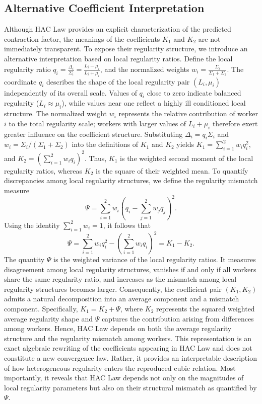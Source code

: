\documentclass[mathematics,article,submit,moreauthors]{Definitions/mdpi}
\begin{document}
\subsection{Alternative Coefficient Interpretation} \label{sec:weighted-moment} Although HAC Law provides an explicit characterization of the predicted contraction factor, the meanings of the coefficients \(K_1\) and \(K_2\) are not immediately transparent. To expose their regularity structure, we introduce an alternative interpretation based on local regularity ratios. Define the local regularity ratio $q_i = \frac{\Delta_i}{\Sigma_i} = \frac{L_i-\mu_i}{L_i+\mu_i}$, and the normalized weights $w_i = \frac{\Sigma_i}{\Sigma_1+\Sigma_2}$. The coordinate \(q_i\) describes the shape of the local regularity pair \((L_i,\mu_i)\) independently of its overall scale. Values of $q_i$ close to zero indicate balanced regularity ($L_i \approx \mu_i$), while values near one reflect a highly ill conditioned local structure. The normalized weight \(w_i\) represents the relative contribution of worker \(i\) to the total regularity scale; workers with larger values of \(L_i+\mu_i\) therefore exert greater influence on the coefficient structure. Substituting \( \Delta_i=q_i\Sigma_i \) and \( w_i=\Sigma_i/(\Sigma_1+\Sigma_2) \) into the definitions of \(K_1\) and \(K_2\) yields $K_1=\sum_{i=1}^{2} w_i q_i^2$, and $K_2= \left( \sum_{i=1}^{2} w_i q_i \right)^2$. Thus, \(K_1\) is the weighted second moment of the local regularity ratios, whereas \(K_2\) is the square of their weighted mean. To quantify discrepancies among local regularity structures, we define the regularity mismatch measure \[ \Psi = \sum_{i=1}^{2} w_i \left( q_i- \sum_{j=1}^{2}w_jq_j \right)^2. \] Using the identity \(\sum_{i=1}^{2}w_i=1\), it follows that \[ \Psi = \sum_{i=1}^{2} w_i q_i^2 - \left( \sum_{i=1}^{2} w_i q_i \right)^2 = K_1-K_2. \] The quantity \(\Psi\) is the weighted variance of the local regularity ratios. It measures disagreement among local regularity structures, vanishes if and only if all workers share the same regularity ratio, and increases as the mismatch among local regularity structures becomes larger. Consequently, the coefficient pair \((K_1,K_2)\) admits a natural decomposition into an average component and a mismatch component. Specifically, $K_1=K_2+\Psi$, where \(K_2\) represents the squared weighted average regularity shape and \(\Psi\) captures the contribution arising from differences among workers. Hence, HAC Law depends on both the average regularity structure and the regularity mismatch among workers. This representation is an exact algebraic rewriting of the coefficients appearing in HAC Law and does not constitute a new convergence law. Rather, it provides an interpretable description of how heterogeneous regularity enters the reproduced cubic relation. Most importantly, it reveals that HAC Law depends not only on the magnitudes of local regularity parameters but also on their structural mismatch as quantified by \(\Psi\). 
\end{document}
